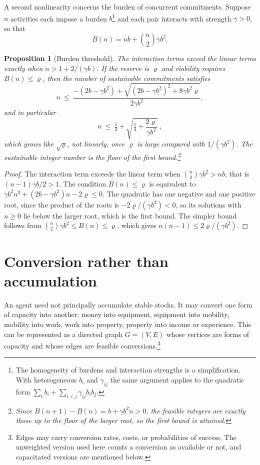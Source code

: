 \documentclass[11pt]{article}
\newtheorem{proposition}{Proposition}
\theoremstyle{remark}
\begin{document}
A second nonlinearity concerns the burden of concurrent commitments. Suppose $n$ activities each impose a burden $b$\footnote{The homogeneity of burdens and interaction strengths is a simplification. With heterogeneous $b_i$ and $\gamma_{ij}$ the same argument applies to the quadratic form $\sum_ib_i+\sum_{i<j}\gamma_{ij}b_ib_j$.} and each pair interacts with strength $\gamma>0$, so that
\[
B(n)=nb+\binom n2\gamma b^2 .
\]

\begin{proposition}[Burden threshold]
The interaction terms exceed the linear terms exactly when $n>1+2/(\gamma b)$. If the reserve is $\varrho$ and viability requires $B(n)\le\varrho$, then the number of sustainable commitments satisfies
\[
n\ \le\ \frac{-(2b-\gamma b^2)+\sqrt{(2b-\gamma b^2)^2+8\gamma b^2\varrho}}{2\gamma b^2},
\]
and in particular
\[
n\ \le\ \tfrac12+\sqrt{\tfrac14+\frac{2\varrho}{\gamma b^2}}\ ,
\]
which grows like $\sqrt{\varrho}$, not linearly, once $\varrho$ is large compared with $1/(\gamma b^2)$. The sustainable integer number is the floor of the first bound.\footnote{Since $B(n+1)-B(n)=b+\gamma b^2n>0$, the feasible integers are exactly those up to the floor of the larger root, so the first bound is attained.}
\end{proposition}

\begin{proof}
The interaction term exceeds the linear term when $\binom n2\gamma b^2>nb$, that is $(n-1)\gamma b/2>1$. The condition $B(n)\le\varrho$ is equivalent to $\gamma b^2n^2+(2b-\gamma b^2)n-2\varrho\le0$. The quadratic has one negative and one positive root, since the product of the roots is $-2\varrho/(\gamma b^2)<0$, so its solutions with $n\ge0$ lie below the larger root, which is the first bound. The simpler bound follows from $\binom n2\gamma b^2\le B(n)\le\varrho$, which gives $n(n-1)\le 2\varrho/(\gamma b^2)$.
\end{proof}


\section{Conversion rather than accumulation}

An agent need not principally accumulate stable stocks. It may convert one form of capacity into another: money into equipment, equipment into mobility, mobility into work, work into property, property into income or experience. This can be represented as a directed graph $G=(V,E)$ whose vertices are forms of capacity and whose edges are feasible conversions.\footnote{Edges may carry conversion rates, costs, or probabilities of success. The unweighted version used here counts a conversion as available or not, and capacitated versions are mentioned below.}
\end{document}
